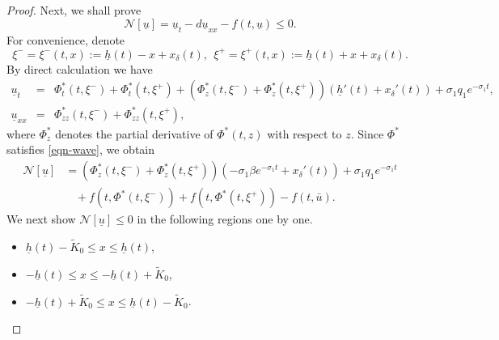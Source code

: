 \documentclass[11pt]{amsart}
\numberwithin{equation}{section}
\begin{document}
\begin{proof}
Next, we shall prove
\begin{equation*}
  \mathcal{N}[\underline{u}]=\underline{u}_t-d\underline{u}_{xx}-f(t,\underline{u})\leq 0.
\end{equation*}
For convenience, denote 
\[
\xi^-=\xi^-(t,x):=\underline{h}(t)-x+x_\delta(t),\ \ \xi^+=\xi^+(t,x):=\underline{h}(t)+x+x_\delta(t).
\]
 By direct calculation we have 
\begin{eqnarray*}
  \underline{u}_t&=& \Phi_t^*(t,\xi^-)+\Phi^*_t(t,\xi^+)+(\Phi^*_z(t,\xi^-)+\Phi^*_z(t,\xi^+))(\underline{h}'(t)+x_\delta'(t))+\sigma_1q_1 e^{-\sigma_1t},\\
  \underline{u}_{xx}&=& \Phi^*_{zz}(t,\xi^-)+\Phi^*_{zz}(t,\xi^+),
\end{eqnarray*}
where $\Phi^*_z$ denotes the partial derivative of $\Phi^*(t,z) $ with respect to $z$.
Since $\Phi^*$ satisfies \eqref{eqn-wave}, we obtain
\begin{equation}\label{eq-Nu_}
\begin{aligned}
  \mathcal{N}[\underline{u}]&= (\Phi^*_z(t,\xi^-)+\Phi^*_z(t,\xi^+))(-\sigma_1\beta e^{-\sigma_1t}+x_\delta'(t))+\sigma_1q_1 e^{-\sigma_1t}\\
  &\ \ \ \ +f(t,\Phi^*(t,\xi^-))+f(t,\Phi^*(t,\xi^+))-f\left(t,\bar{u}\right).
  \end{aligned}
\end{equation}
We next show  $\mathcal{N}[\underline{u}]\leq 0$ in the following regions one by one.
\begin{itemize}
\item[(a):] $ \underline{h}(t)-\tilde{K}_0\leq x\leq \underline{h}(t)$, 
\item[(b):] $  -\underline{h}(t)\leq x\leq -\underline{h}(t)+\tilde{K}_0$, 
\item[(c):] $  -\underline{h}(t)+\tilde{K}_0\leq x\leq \underline{h}(t)-\tilde{K}_0$.
\end{itemize}
\medskip


\end{proof}
\end{document}
